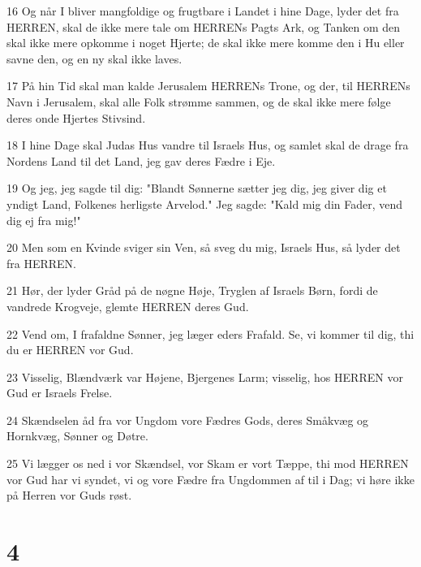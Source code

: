 \par 16 Og når I bliver mangfoldige og frugtbare i Landet i hine Dage, lyder det fra HERREN, skal de ikke mere tale om HERRENs Pagts Ark, og Tanken om den skal ikke mere opkomme i noget Hjerte; de skal ikke mere komme den i Hu eller savne den, og en ny skal ikke laves.
\par 17 På hin Tid skal man kalde Jerusalem HERRENs Trone, og der, til HERRENs Navn i Jerusalem, skal alle Folk strømme sammen, og de skal ikke mere følge deres onde Hjertes Stivsind.
\par 18 I hine Dage skal Judas Hus vandre til Israels Hus, og samlet skal de drage fra Nordens Land til det Land, jeg gav deres Fædre i Eje.
\par 19 Og jeg, jeg sagde til dig: "Blandt Sønnerne sætter jeg dig, jeg giver dig et yndigt Land, Folkenes herligste Arvelod." Jeg sagde: "Kald mig din Fader, vend dig ej fra mig!"
\par 20 Men som en Kvinde sviger sin Ven, så sveg du mig, Israels Hus, så lyder det fra HERREN.
\par 21 Hør, der lyder Gråd på de nøgne Høje, Tryglen af Israels Børn, fordi de vandrede Krogveje, glemte HERREN deres Gud.
\par 22 Vend om, I frafaldne Sønner, jeg læger eders Frafald. Se, vi kommer til dig, thi du er HERREN vor Gud.
\par 23 Visselig, Blændværk var Højene, Bjergenes Larm; visselig, hos HERREN vor Gud er Israels Frelse.
\par 24 Skændselen åd fra vor Ungdom vore Fædres Gods, deres Småkvæg og Hornkvæg, Sønner og Døtre.
\par 25 Vi lægger os ned i vor Skændsel, vor Skam er vort Tæppe, thi mod HERREN vor Gud har vi syndet, vi og vore Fædre fra Ungdommen af til i Dag; vi høre ikke på Herren vor Guds røst.

\chapter{4}

